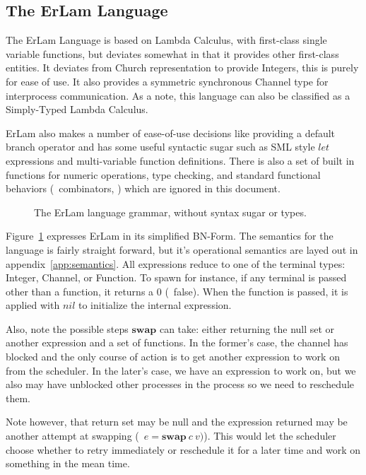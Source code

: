 \subsection{The ErLam Language}\label{sec:the erlam language}

The ErLam Language is based on Lambda Calculus, with first-class single 
variable functions, but deviates somewhat in that it provides other first-class 
entities. It deviates from Church representation to provide Integers, this is
purely for ease of use. It also provides a symmetric synchronous Channel type 
for interprocess communication. As a note, this language can also be classified 
as a Simply-Typed Lambda Calculus.

ErLam also makes a number of ease-of-use decisions like providing a default 
branch operator and has some useful syntactic sugar such as SML style $let$ 
expressions and multi-variable function definitions. There is also a set of
built in functions for numeric operations, type checking, and standard 
functional behaviors (\eg~combinators, \etc) which are ignored in this 
document.

\begin{figure} %
\centering

\caption{The ErLam language grammar, without syntax sugar or types.}
\label{fig:grammer}
\end{figure}

Figure~\ref{fig:grammer} expresses ErLam in its simplified BN-Form. The 
semantics for the language is fairly straight forward, but it's operational 
semantics are layed out in appendix~\ref{app:semantics}. All expressions reduce
to one of the terminal types: Integer, Channel, or Function. To spawn for 
instance, if any terminal is passed other than a function, it returns a $0$
(\eg~false). When the function is passed, it is applied with $nil$ to 
initialize the internal expression. 

Also, note the possible steps $\textbf{swap}$ can take: either returning the 
null set or another expression and a set of functions. In the former's case, 
the channel has blocked and the only course of action is to get another 
expression to work on from the scheduler. In the later's case, we have an
expression to work on, but we also may have unblocked other processes in the
process so we need to reschedule them. 

Note however, that return set may be null and the expression returned may be
another attempt at swapping (\ie~$e = \textbf{swap}\:c\:v)$). This would let 
the scheduler choose whether to retry immediately or reschedule it for a later
time and work on something in the mean time.

